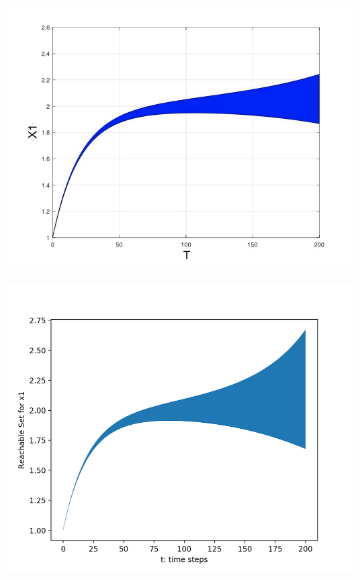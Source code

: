 \documentclass[EPiC]{easychair}
\begin{document}
\begin{figure}[h]
    \begin{subfigure}{0.47\textwidth}
    \centering
    \includegraphics[width=\textwidth]{SapoFigures/Phos/SapoKaa_X1.jpg}
    \end{subfigure}
    \begin{subfigure}{0.47\textwidth}
    \centering
    \includegraphics[width=1.1\textwidth,height=0.82\textwidth]{SapoFigures/Phos/KaaPhos_X1.png}
    \end{subfigure}
    

\end{figure}
\end{document}
